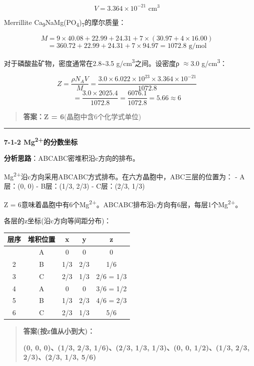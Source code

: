 \documentclass[a4paper,11pt]{ctexart}
\newcounter{none}
\newcommand{\箭}{\ensuremath{\rightarrow}}
\newcommand{\左箭}{\ensuremath{\leftarrow}}
\newcommand{\上箭}{\ensuremath{\uparrow}}
\newcommand{\下箭}{\ensuremath{\downarrow}}
\newcommand{\衡}{\ensuremath{\rightleftharpoons}}
\newcommand{\双箭}{\ensuremath{\leftrightarrow}}
\newcommand{\约等于}{\ensuremath{\approx}}
\newcommand{\小于等于}{\ensuremath{\leq}}
\newcommand{\大于等于}{\ensuremath{\geq}}
\newcommand{\不等于}{\ensuremath{\neq}}
\newcommand{\西格马}{\ensuremath{\sigma}}
\newcommand{\派}{\ensuremath{\pi}}
\begin{document}
\[V = 3.364 \times 10^{-21} \text{ cm}^3\]

Merrillite Ca\textsubscript{9}NaMg(PO\textsubscript{4})\textsubscript{7}的摩尔质量：

\[M = 9 \times 40.08 + 22.99 + 24.31 + 7 \times (30.97 + 4 \times 16.00)\]
\[= 360.72 + 22.99 + 24.31 + 7 \times 94.97 = 1072.8 \text{ g/mol}\]

对于磷酸盐矿物，密度通常在2.8\textasciitilde3.5 g/cm\textsuperscript{3}之间。设密度ρ \约等于 3.0 g/cm\textsuperscript{3}：

\[Z = \frac{\rho N_A V}{M} = \frac{3.0 \times 6.022 \times 10^{23} \times 3.364 \times 10^{-21}}{1072.8}\]
\[= \frac{3.0 \times 2025.4}{1072.8} = \frac{6076.1}{1072.8} = 5.66 \approx 6\]

\begin{quote}
\textbf{答案：Z = 6}(晶胞中含6个化学式单位)
\end{quote}

\begin{center}\rule{0.5\linewidth}{0.5pt}\end{center}

\textbf{7-1-2 Mg\textsuperscript{2+}的分数坐标}

\textbf{分析思路}：ABCABC密堆积沿c方向的排布。

Mg\textsuperscript{2+}沿c方向采用ABCABC方式排布。在六方晶胞中，ABC三层的位置为：
- A层：(0, 0)
- B层：(1/3, 2/3)
- C层：(2/3, 1/3)

Z = 6意味着晶胞中有6个Mg\textsuperscript{2+}。ABCABC排布沿c方向有6层，每层1个Mg\textsuperscript{2+}。

各层的z坐标(沿c方向等间距分布)：

{\def\LTcaptype{none} %
\begin{longtable}[]{@{}ccccc@{}}
\toprule\noalign{}
层序 & 堆积位置 & x & y & z \\
\midrule\noalign{}
\endhead
\bottomrule\noalign{}
\endlastfoot
1 & A & 0 & 0 & 0 \\
2 & B & 1/3 & 2/3 & 1/6 \\
3 & C & 2/3 & 1/3 & 2/6 = 1/3 \\
4 & A & 0 & 0 & 3/6 = 1/2 \\
5 & B & 1/3 & 2/3 & 4/6 = 2/3 \\
6 & C & 2/3 & 1/3 & 5/6 \\
\end{longtable}
}

\begin{quote}
\textbf{答案(按z值从小到大)：}

\textbf{(0, 0, 0)、(1/3, 2/3, 1/6)、(2/3, 1/3, 1/3)、(0, 0, 1/2)、(1/3, 2/3, 2/3)、(2/3, 1/3, 5/6)}
\end{quote}
\end{document}
